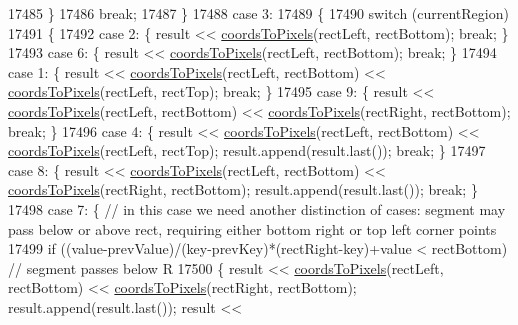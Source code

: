 \begin{DoxyCode}
17485       \}
17486       \textcolor{keywordflow}{break};
17487     \}
17488     \textcolor{keywordflow}{case} 3:
17489     \{
17490       \textcolor{keywordflow}{switch} (currentRegion)
17491       \{
17492         \textcolor{keywordflow}{case} 2: \{ result << \hyperlink{class_q_c_p_abstract_plottable_ade710a776104b14c1c835168ce1bfc5c}{coordsToPixels}(rectLeft, rectBottom); \textcolor{keywordflow}{break}; \}
17493         \textcolor{keywordflow}{case} 6: \{ result << \hyperlink{class_q_c_p_abstract_plottable_ade710a776104b14c1c835168ce1bfc5c}{coordsToPixels}(rectLeft, rectBottom); \textcolor{keywordflow}{break}; \}
17494         \textcolor{keywordflow}{case} 1: \{ result << \hyperlink{class_q_c_p_abstract_plottable_ade710a776104b14c1c835168ce1bfc5c}{coordsToPixels}(rectLeft, rectBottom) << 
      \hyperlink{class_q_c_p_abstract_plottable_ade710a776104b14c1c835168ce1bfc5c}{coordsToPixels}(rectLeft, rectTop); \textcolor{keywordflow}{break}; \}
17495         \textcolor{keywordflow}{case} 9: \{ result << \hyperlink{class_q_c_p_abstract_plottable_ade710a776104b14c1c835168ce1bfc5c}{coordsToPixels}(rectLeft, rectBottom) << 
      \hyperlink{class_q_c_p_abstract_plottable_ade710a776104b14c1c835168ce1bfc5c}{coordsToPixels}(rectRight, rectBottom); \textcolor{keywordflow}{break}; \}
17496         \textcolor{keywordflow}{case} 4: \{ result << \hyperlink{class_q_c_p_abstract_plottable_ade710a776104b14c1c835168ce1bfc5c}{coordsToPixels}(rectLeft, rectBottom) << 
      \hyperlink{class_q_c_p_abstract_plottable_ade710a776104b14c1c835168ce1bfc5c}{coordsToPixels}(rectLeft, rectTop); result.append(result.last()); \textcolor{keywordflow}{break}; \}
17497         \textcolor{keywordflow}{case} 8: \{ result << \hyperlink{class_q_c_p_abstract_plottable_ade710a776104b14c1c835168ce1bfc5c}{coordsToPixels}(rectLeft, rectBottom) << 
      \hyperlink{class_q_c_p_abstract_plottable_ade710a776104b14c1c835168ce1bfc5c}{coordsToPixels}(rectRight, rectBottom); result.append(result.last()); \textcolor{keywordflow}{break}; \}
17498         \textcolor{keywordflow}{case} 7: \{ \textcolor{comment}{// in this case we need another distinction of cases: segment may pass below or above
       rect, requiring either bottom right or top left corner points}
17499           \textcolor{keywordflow}{if} ((value-prevValue)/(key-prevKey)*(rectRight-key)+value < rectBottom) \textcolor{comment}{// segment passes below R}
17500           \{ result << \hyperlink{class_q_c_p_abstract_plottable_ade710a776104b14c1c835168ce1bfc5c}{coordsToPixels}(rectLeft, rectBottom) << 
      \hyperlink{class_q_c_p_abstract_plottable_ade710a776104b14c1c835168ce1bfc5c}{coordsToPixels}(rectRight, rectBottom); result.append(result.last()); result << 

\end{DoxyCode}
